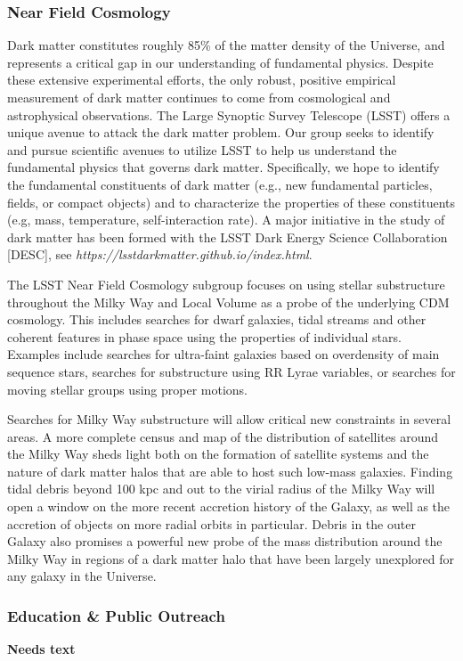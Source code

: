 \subsubsection{Near Field Cosmology}

Dark matter constitutes roughly 85\% of the matter density of the Universe, and represents a critical gap in our understanding of fundamental physics. Despite these extensive experimental efforts, the only robust, positive empirical measurement of dark matter continues to come from cosmological and astrophysical observations. The Large Synoptic Survey Telescope (LSST) offers a unique avenue to attack the dark matter problem. Our group seeks to identify and pursue scientific avenues to utilize LSST to help us understand the fundamental physics that governs dark matter. Specifically, we hope to identify the fundamental constituents of dark matter (e.g., new fundamental particles, fields, or compact objects) and to characterize the properties of these constituents (e.g, mass, temperature, self-interaction rate).
A major initiative in the study of dark matter has been formed with the LSST Dark Energy Science Collaboration [DESC], see
{\it https://lsstdarkmatter.github.io/index.html}.

The LSST Near Field Cosmology subgroup focuses on using stellar substructure throughout the Milky Way
 and Local Volume as a probe of the underlying CDM cosmology.  
This includes searches for dwarf galaxies, tidal streams and other coherent features in 
phase space using the properties of individual stars. 
Examples include searches for ultra-faint galaxies based on overdensity of main sequence stars, 
searches for substructure using RR Lyrae variables, or searches for moving stellar groups using proper motions. 

Searches for Milky Way substructure will allow critical new constraints in several areas. 
A more complete census and map of the distribution of satellites around the Milky Way sheds 
light both on the formation of satellite systems and the nature of dark matter halos that are 
able to host such low-mass galaxies.
 Finding tidal debris beyond 100 kpc and out to the virial radius of the Milky Way will open a 
window on the more recent accretion history of the Galaxy, as well as the accretion of objects 
on more radial orbits in particular. 
Debris in the outer Galaxy also promises a powerful new probe of the mass 
distribution around the Milky Way in regions of a dark matter halo that have been largely 
unexplored for any galaxy in the Universe. 

\subsubsection{Education \& Public Outreach}

{\bf Needs text}

